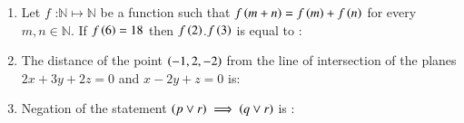 \documentclass[journal]{IEEEtran}
\begin{document}
\begin{enumerate}[start=1]
\item %
Let $f$ :$ \mathbb{N} \mapsto \mathbb{N}$ be a  function such that $f\left(m+n\right)=f\left(m\right)+f\left(n\right)$ for every $m,n \in \mathbb{N}$. If $f\left(6\right)=18$ then $f\left(2\right)$.$f\left(3\right)$ is equal to :
\begin{enumerate}
\end{enumerate}
\begin{enumerate}
\end{enumerate}
\item %
The distance of the point $\left(-1,2,-2\right)$ from the line of intersection of the planes $2x+3y+2z=0$ and $x-2y+z=0$ is:
\begin{enumerate}
\end{enumerate}
\begin{enumerate}
\end{enumerate}
\item %
Negation of the statement $\left(p \vee r \right) \implies \left(q \vee r \right)$ is :
\begin{enumerate}
\end{enumerate}
\begin{enumerate}

\end{enumerate}
\end{enumerate}
\end{document}
